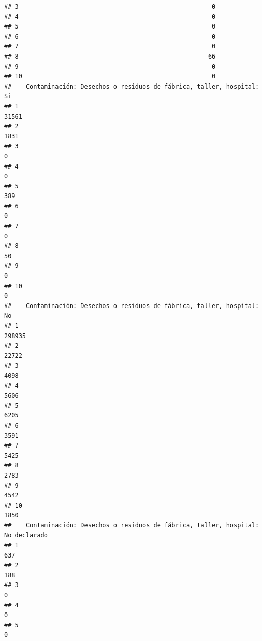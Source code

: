 \documentclass[11pt,]{article}
\begin{document}
\begin{verbatim}
## 3                                                     0
## 4                                                     0
## 5                                                     0
## 6                                                     0
## 7                                                     0
## 8                                                    66
## 9                                                     0
## 10                                                    0
##    Contaminación: Desechos o residuos de fábrica, taller, hospital: Si
## 1                                                                31561
## 2                                                                 1831
## 3                                                                    0
## 4                                                                    0
## 5                                                                  389
## 6                                                                    0
## 7                                                                    0
## 8                                                                   50
## 9                                                                    0
## 10                                                                   0
##    Contaminación: Desechos o residuos de fábrica, taller, hospital: No
## 1                                                               298935
## 2                                                                22722
## 3                                                                 4098
## 4                                                                 5606
## 5                                                                 6205
## 6                                                                 3591
## 7                                                                 5425
## 8                                                                 2783
## 9                                                                 4542
## 10                                                                1850
##    Contaminación: Desechos o residuos de fábrica, taller, hospital: No declarado
## 1                                                                            637
## 2                                                                            188
## 3                                                                              0
## 4                                                                              0
## 5                                                                              0

\end{verbatim}
\end{document}
